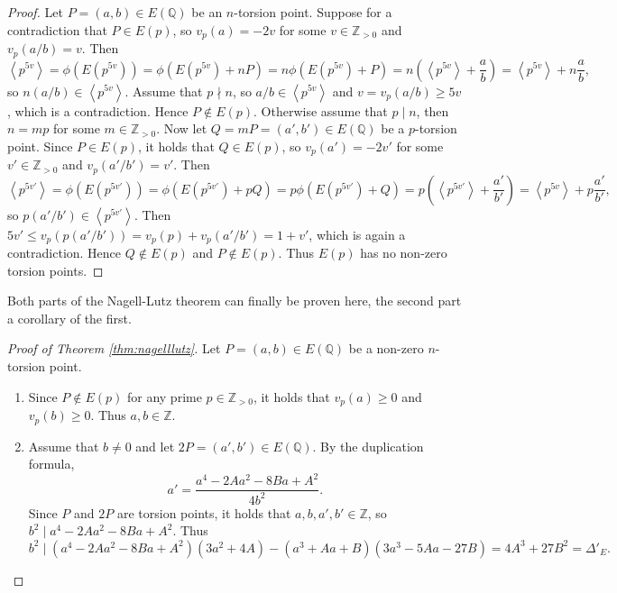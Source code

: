 \documentclass{article}
\newcommand{\Z}{\mathbb{Z}}
\newcommand{\Q}{\mathbb{Q}}
\newcommand{\rb}[1]{\left( #1 \right)}
\newcommand{\ab}[1]{\left\langle #1 \right\rangle}
\theoremstyle{definition}
\begin{document}
\begin{proof}
Let $ P = \rb{a, b} \in E\rb{\Q} $ be an $ n $-torsion point. Suppose for a contradiction that $ P \in E\rb{p} $, so $ v_p\rb{a} = -2v $ for some $ v \in \Z_{> 0} $ and $ v_p\rb{a / b} = v $. Then
$$ \ab{p^{5v}} = \phi\rb{E\rb{p^{5v}}} = \phi\rb{E\rb{p^{5v}} + nP} = n\phi\rb{E\rb{p^{5v}} + P} = n\rb{\ab{p^{5v}} + \dfrac{a}{b}} = \ab{p^{5v}} + n\dfrac{a}{b}, $$
so $ n\rb{a / b} \in \ab{p^{5v}} $. Assume that $ p \nmid n $, so $ a / b \in \ab{p^{5v}} $ and $ v = v_p\rb{a / b} \ge 5v $, which is a contradiction. Hence $ P \notin E\rb{p} $. Otherwise assume that $ p \mid n $, then $ n = mp $ for some $ m \in \Z_{> 0} $. Now let $ Q = mP = \rb{a', b'} \in E\rb{\Q} $ be a $ p $-torsion point. Since $ P \in E\rb{p} $, it holds that $ Q \in E\rb{p} $, so $ v_p\rb{a'} = -2v' $ for some $ v' \in \Z_{> 0} $ and $ v_p\rb{a' / b'} = v' $. Then
$$ \ab{p^{5v'}} = \phi\rb{E\rb{p^{5v'}}} = \phi\rb{E\rb{p^{5v'}} + pQ} = p\phi\rb{E\rb{p^{5v'}} + Q} = p\rb{\ab{p^{5v'}} + \dfrac{a'}{b'}} = \ab{p^{5v}} + p\dfrac{a'}{b'}, $$
so $ p\rb{a' / b'} \in \ab{p^{5v'}} $. Then $ 5v' \le v_p\rb{p\rb{a' / b'}} = v_p\rb{p} + v_p\rb{a' / b'} = 1 + v' $, which is again a contradiction. Hence $ Q \notin E\rb{p} $ and $ P \notin E\rb{p} $. Thus $ E\rb{p} $ has no non-zero torsion points.
\end{proof}

Both parts of the Nagell-Lutz theorem can finally be proven here, the second part a corollary of the first.

\begin{proof}[Proof of Theorem \ref{thm:nagelllutz}]
Let $ P = \rb{a, b} \in E\rb{\Q} $ be a non-zero $ n $-torsion point.
\begin{enumerate}
\item Since $ P \notin E\rb{p} $ for any prime $ p \in \Z_{> 0} $, it holds that $ v_p\rb{a} \ge 0 $ and $ v_p\rb{b} \ge 0 $. Thus $ a, b \in \Z $.
\item Assume that $ b \ne 0 $ and let $ 2P = \rb{a', b'} \in E\rb{\Q} $. By the duplication formula,
$$ a' = \dfrac{a^4 - 2Aa^2 - 8Ba + A^2}{4b^2}. $$
Since $ P $ and $ 2P $ are torsion points, it holds that $ a, b, a', b' \in \Z $, so $ b^2 \mid a^4 - 2Aa^2 - 8Ba + A^2 $. Thus
$$ b^2 \mid \rb{a^4 - 2Aa^2 - 8Ba + A^2}\rb{3a^2 + 4A} - \rb{a^3 + Aa + B}\rb{3a^3 - 5Aa - 27B} = 4A^3 + 27B^2 = \Delta'_E. $$
\end{enumerate}
\end{proof}

\pagebreak
\end{document}

